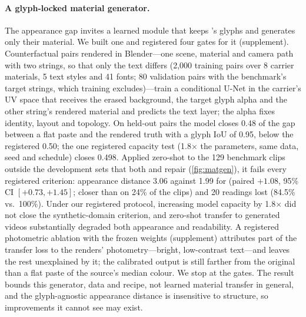\paragraph{A glyph-locked material generator.} The appearance gap invites a learned module that keeps \method's glyphs and generates only their material. We built one and registered four gates for it (supplement). Counterfactual pairs rendered in Blender---one scene, material and camera path with two strings, so that only the text differs (2{,}000 training pairs over 8 carrier materials, 5 text styles and 41 fonts; 80 validation pairs with the benchmark's target strings, which training excludes)---train a conditional U-Net in the carrier's UV space that receives the erased background, the target glyph alpha and the other string's rendered material and predicts the text layer; the alpha fixes identity, layout and topology. On held-out pairs the model closes 0.48 of the gap between a flat paste and the rendered truth with a glyph IoU of 0.95, below the registered 0.50; the one registered capacity test (1.8$\times$ the parameters, same data, seed and schedule) closes 0.498. Applied zero-shot to the 129 benchmark clips outside the development sets that both \method and \steer repair (\cref{fig:matgen}), it fails every registered criterion: appearance distance 3.06 against 1.99 for \method (paired $+1.08$, 95\% CI $[+0.73, +1.45]$; closer than \method on 24\% of the clips) and 20 readings lost (84.5\% vs.\ 100\%). Under our registered protocol, increasing model capacity by 1.8$\times$ did not close the synthetic-domain criterion, and zero-shot transfer to generated videos substantially degraded both appearance and readability. A registered photometric ablation with the frozen weights (supplement) attributes part of the transfer loss to the renders' photometry---bright, low-contrast text---and leaves the rest unexplained by it; the calibrated output is still farther from the original than a flat paste of the source's median colour. We stop at the gates. The result bounds this generator, data and recipe, not learned material transfer in general, and the glyph-agnostic appearance distance is insensitive to structure, so improvements it cannot see may exist.
